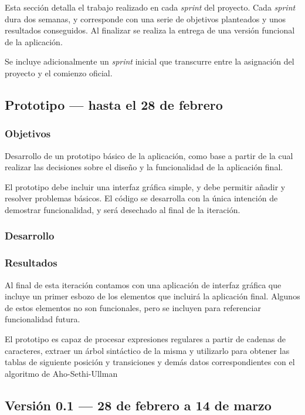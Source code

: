 
Esta sección detalla el trabajo realizado en cada \emph{sprint} del proyecto. Cada \emph{sprint} dura dos semanas, y corresponde con una serie de objetivos planteados y unos resultados conseguidos.
Al finalizar se realiza la entrega de una versión funcional de la aplicación.

Se incluye adicionalmente un \emph{sprint} inicial que transcurre entre la asignación del proyecto y el comienzo oficial.

\subsection{Prototipo --- hasta el 28 de febrero}

\subsubsection{Objetivos}
Desarrollo de un prototipo básico de la aplicación, como base a partir de la cual realizar las decisiones sobre el diseño y la funcionalidad de la aplicación final.

El prototipo debe incluir una interfaz gráfica simple, y debe permitir añadir y resolver problemas básicos. 
El código se desarrolla con la única intención de demostrar funcionalidad, y será desechado al final de la iteración.

\subsubsection{Desarrollo}

\subsubsection{Resultados}
Al final de esta iteración contamos con una aplicación de interfaz gráfica que incluye un primer esbozo de los elementos que incluirá la aplicación final.
Algunos de estos elementos no son funcionales, pero se incluyen para referenciar funcionalidad futura.

El prototipo es capaz de procesar expresiones regulares a partir de cadenas de caracteres, extraer un árbol sintáctico de la misma y utilizarlo para obtener las tablas de siguiente posición y transiciones y demás datos correspondientes con el algoritmo de Aho-Sethi-Ullman

\subsection{Versión 0.1 --- 28 de febrero a 14 de marzo}


